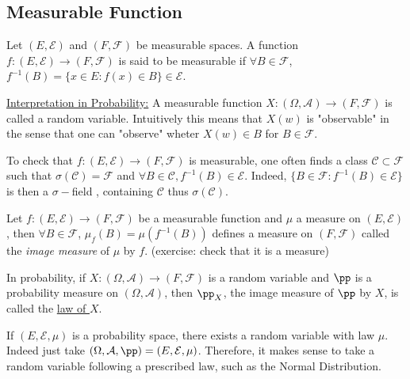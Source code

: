 \documentclass[../main.tex]{subfiles}
\begin{document}
  \subsection{Measurable Function}
  \begin{definition}
    Let $(E, \mathcal{E})$ and $(F, \mathcal{F})$ be measurable spaces. A function $f: (E,
    \mathcal{E}) \to (F, \mathcal{F})$ is said to be measurable if $\forall B \in \mathcal{F}$,
    $f^{-1}(B) = \{ x \in E \colon f(x) \in B \} \in \mathcal{E} $.
  \end{definition}

  \underline{Interpretation in Probability:} A measurable function $X: (\Omega, \mathcal{A})
  \to (F, \mathcal{F})$ is called a random variable. Intuitively this means that $X(w)$ is
  "observable" in the sense that one can "observe" wheter $X(w) \in B$ for $B \in \mathcal{F}$.

  \begin{proposition}
      To check that $f: (E, \mathcal{E}) \to (F, \mathcal{F})$ is measurable, one often finds a
      class $\mathcal{C} \subset \mathcal{F}$ such that $\sigma(\mathcal{C}) = \mathcal{F}$ and
      $\forall B \in \mathcal{C}, f^{-1}(B) \in \mathcal{E}$. Indeed,
      $\{ B \in \mathcal{F} \colon f^{-1}(B) \in \mathcal{E} \} $ is then a $\sigma-$field
      , containing $\mathcal{C}$ thus $\sigma(\mathcal{C})$.
  \end{proposition}

  \begin{definition}
    Let $f: (E, \mathcal{E}) \to (F, \mathcal{F})$ be a measurable function and $\mu$ a measure
  on $(E, \mathcal{E})$, then $\forall B \in \mathcal{F}$, $\mu_f(B) = \mu(f^{-1}(B))$ defines
  a measure on $(F, \mathcal{F})$ called the \textit{image measure} of $\mu$ by $f$. (exercise:
  check that it is a measure) 
  \end{definition}

  In probability, if $X: (\Omega,  \mathcal{A}) \to (F, \mathcal{F})$ is a random variable and
  $\pp$ is a probability measure on $(\Omega, \mathcal{A})$, then $\pp_X$, the image measure of
  $\pp$ by $X$, is called the \underline{law of $X$}.

  \begin{remark}
      If $(E, \mathcal{E}, \mu)$ is a probability space, there exists a random variable with
      law $\mu$. Indeed just take $(\Omega, \mathcal{A}, \pp) = (E, \mathcal{E}, \mu)$.
      Therefore, it makes sense to take a random variable following a prescribed law, such as
      the Normal Distribution.
  \end{remark}
\end{document}
